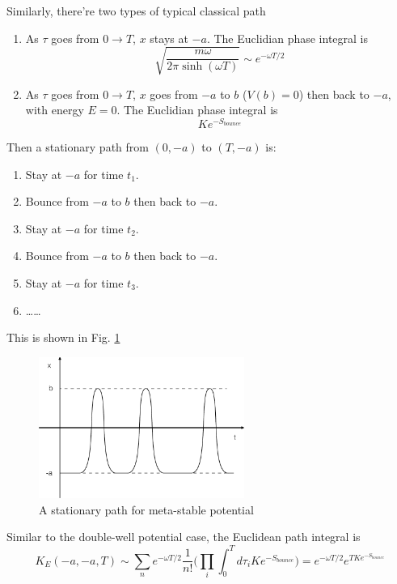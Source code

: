 \documentclass[12pt]{book}
\begin{document}
	Similarly, there're two types of typical classical path
	\begin{enumerate}
		\item As $\tau$ goes from $0\rightarrow T$, $x$ stays at $-a$. The Euclidian phase integral is
			\begin{equation}
				\sqrt{\frac{m\omega}{2\pi \sinh(\omega T)}}\sim e^{-\omega T/2}
			\end{equation}
			
		\item As $\tau$ goes from $0\rightarrow T$, $x$ goes from $-a$ to $b$ ($V(b)=0$) then back to $-a$, with energy $E=0$. The Euclidian phase integral is
			\begin{equation}
				Ke^{-S_{bounce}}
			\end{equation}
	\end{enumerate}
	
	Then a stationary path from $(0,-a)$ to $(T,-a)$ is: 
	\begin{enumerate}
		\item Stay at $-a$ for time $t_1$.
		\item Bounce from $-a$ to $b$ then back to $-a$.
		\item Stay at $-a$ for time $t_2$.
		\item Bounce from $-a$ to $b$ then back to $-a$.
		\item Stay at $-a$ for time $t_3$.
		\item \dots\dots
	\end{enumerate}
	This is shown in Fig. \ref{fig:meta_path} 
	
	\begin{figure}[htb!]
		\centering  
		\includegraphics[width=0.6\textwidth]{resources/chap_path_int/meta_path.pdf}
		\caption{A stationary path for meta-stable potential}
		\label{fig:meta_path} 
	\end{figure}

	Similar to the double-well potential case, the Euclidean path integral is
	\begin{equation}
		K_E(-a,-a,T)\sim \sum_{n}e^{-\omega T/2}\frac 1{n!}\Big(\prod_i\int_0^T d\tau_i Ke^{-S_{bounce}}\Big)=e^{-\omega T/2}e^{TKe^{-S_{bounce}}}
	\end{equation}
	
\end{document}
